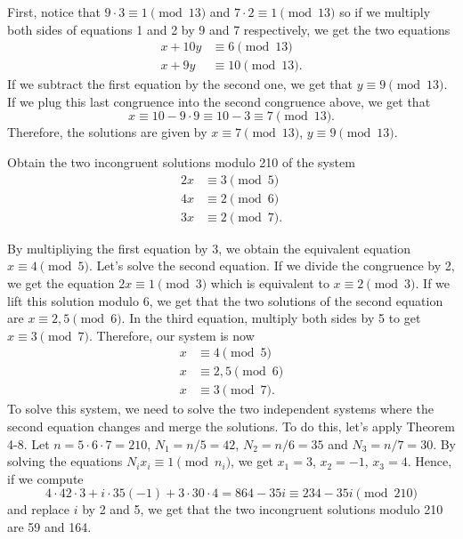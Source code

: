 \begin{solution}
    First, notice that $9 \cdot 3 \equiv 1 \pmod{13}$ and $7 \cdot 2 \equiv 1 \pmod{13}$ so if we multiply both sides of equations 1 and 2 by 9 and 7 respectively, we get the two equations
    \begin{align*}
        x + 10y &\equiv 6 \pmod{13} \\
        x + 9y &\equiv 10 \pmod{13}.
    \end{align*}
    If we subtract the first equation by the second one, we get that $y \equiv 9 \pmod{13}$. If we plug this last congruence into the second congruence above, we get that
    $$x \equiv 10 - 9 \cdot 9 \equiv 10 - 3 \equiv 7 \pmod{13}.$$ 
    Therefore, the solutions are given by $x \equiv 7 \pmod{13}$, $y \equiv 9 \pmod{13}$.\\
\end{solution}

\begin{exercise}
    Obtain the two incongruent solutions modulo 210 of the system
    \begin{align*}
        2x &\equiv 3 \pmod{5} \\
        4x &\equiv 2 \pmod{6} \\
        3x &\equiv 2 \pmod 7. 
    \end{align*}
\end{exercise}

\begin{solution}
    By multipliying the first equation by 3, we obtain the equivalent equation $x \equiv 4 \pmod{5}$. Let's solve the second equation. If we divide the congruence by 2, we get the equation $2x \equiv 1 \pmod 3$ which is equivalent to $x \equiv 2 \pmod{3}$. If we lift this solution modulo 6, we get that the two solutions of the second equation are $x \equiv 2, 5 \pmod 6$. In the third equation, multiply both sides by 5 to get $x \equiv 3 \pmod 7$. Therefore, our system is now
    \begin{align*}
        x &\equiv 4 \pmod{5} \\
        x &\equiv 2,5 \pmod{6} \\
        x &\equiv 3 \pmod 7. 
    \end{align*}
    To solve this system, we need to solve the two independent systems where the second equation changes and merge the solutions. To do this, let's apply Theorem 4-8. Let $n = 5 \cdot 6 \cdot 7 = 210$, $N_1 = n / 5 = 42$, $N_2 = n / 6 = 35$ and $N_3 = n / 7 = 30$. By solving the equations $N_i x_i \equiv 1 \pmod{n_i}$, we get $x_1 = 3$, $x_2 = -1$, $x_3 = 4$. Hence, if we compute
    $$4 \cdot 42 \cdot 3 + i \cdot 35 (-1) + 3 \cdot 30 \cdot 4 = 864 - 35i \equiv 234 - 35i \pmod{210}$$
    and replace $i$ by 2 and 5, we get that the two incongruent solutions modulo 210 are 59 and 164. \\
\end{solution} 